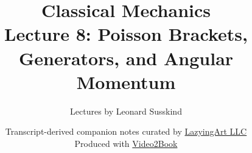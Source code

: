 \documentclass[11pt,oneside]{book}
\begin{document}
\hypersetup{pageanchor=false}
\frontmatter
\title{Classical Mechanics\\[0.45em]
\large Lecture 8: Poisson Brackets, Generators, and Angular Momentum}
\author{Lectures by Leonard Susskind}
\date{Transcript-derived companion notes curated by
\href{https://lazying.art}{LazyingArt LLC}\\[0.35em]
\small Produced with
\href{https://github.com/lachlanchen/Video2Book}{Video2Book}}
\maketitle
\hypersetup{pageanchor=true}
\mainmatter

\end{document}

